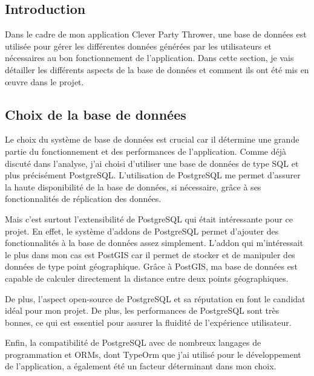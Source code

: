 \subsection{Introduction}\label{subsec:introduction_base_de_donnee}
Dans le cadre de mon application Clever Party Thrower, une base de données est utilisée pour gérer les différentes données générées par les utilisateurs et nécessaires au bon fonctionnement de l'application.
Dans cette section, je vais détailler les différents aspects de la base de données et comment ils ont été mis en œuvre dans le projet.

\subsection{Choix de la base de données}\label{subsec:choix-de-la-base-de-donnee}
Le choix du système de base de données est crucial car il détermine une grande partie du fonctionnement et des performances de l'application.
Comme déjà discuté dans l'analyse, j'ai choisi d'utiliser une base de données de type SQL et plus précisément PostgreSQL. L'utilisation de PostgreSQL me permet d'assurer la haute disponibilité de la base de données, si nécessaire, grâce à ses fonctionnalités de réplication des données.

Mais c'est surtout l'extensibilité de PostgreSQL qui était intéressante pour ce projet.
En effet, le système d'addons de PostgreSQL permet d'ajouter des fonctionnalités à la base de données assez simplement.
L'addon qui m'intéressait le plus dans mon cas est PostGIS car il permet de stocker et de manipuler des données de type point géographique.
Grâce à PostGIS, ma base de données est capable de calculer directement la distance entre deux points géographiques.

De plus, l'aspect open-source de PostgreSQL et sa réputation en font le candidat idéal pour mon projet.
De plus, les performances de PostgreSQL sont très bonnes, ce qui est essentiel pour assurer la fluidité de l'expérience utilisateur.

Enfin, la compatibilité de PostgreSQL avec de nombreux langages de programmation et ORMs,
dont TypeOrm que j'ai utilisé pour le développement de l'application, a également été un facteur déterminant dans mon choix.

